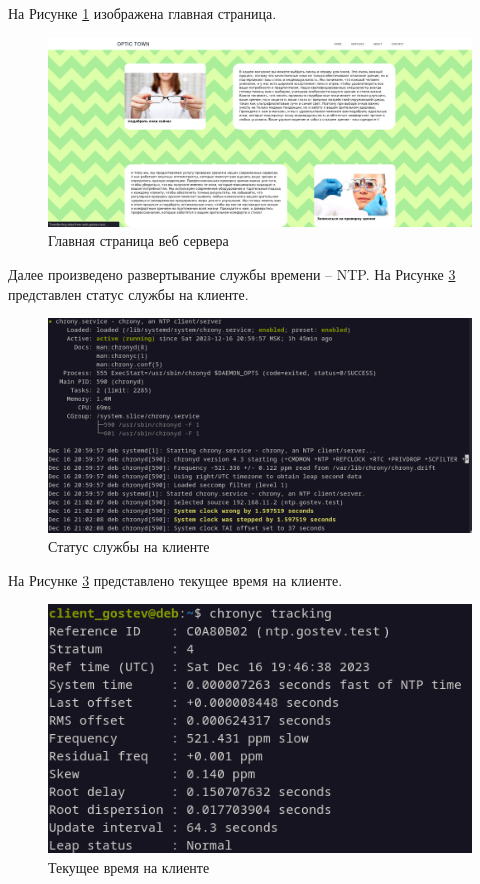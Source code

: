 \documentclass[14pt, a4paper]{extarticle}
\numberwithin{equation}{section}
\begin{document}
На Рисунке \ref{fig:web_index} изображена главная страница.
\begin{figure}[H]
        \centering
        \includegraphics[scale=0.4]{services/web/index.png}
        \caption{Главная страница веб сервера}
        \label{fig:web_index}
\end{figure}


Далее произведено развертывание службы времени -- NTP. 
На Рисунке \ref{fig:ntp_client_status} представлен статус службы на клиенте.
\begin{figure}[H]
        \centering
        \includegraphics[scale=0.7]{services/ntp/client_status.png}
        \caption{Статус службы на клиенте}
        \label{fig:ntp_client_status}
\end{figure}

На Рисунке \ref{fig:ntp_client_status} представлено текущее время на клиенте.
\begin{figure}[H]
        \centering
        \includegraphics[scale=1]{services/ntp/client_time.png}
        \caption{Текущее время на клиенте}
        \label{fig:ntp_client_status}
\end{figure}
\end{document}

